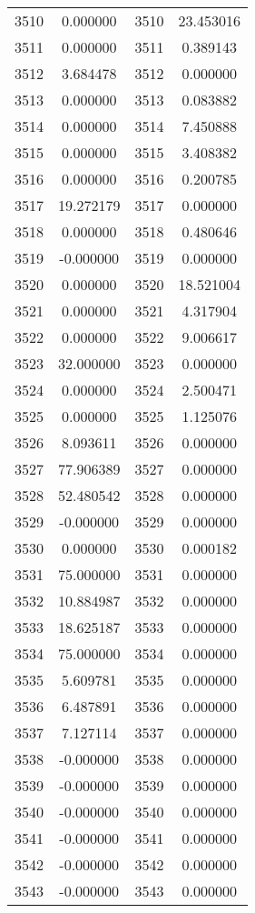 \documentclass[12pt]{article}
\begin{document}
\begin{longtable}{@{}cccc@{}}
3510 & 0.000000 & 3510 & 23.453016 \\
3511 & 0.000000 & 3511 & 0.389143 \\
3512 & 3.684478 & 3512 & 0.000000 \\
3513 & 0.000000 & 3513 & 0.083882 \\
3514 & 0.000000 & 3514 & 7.450888 \\
3515 & 0.000000 & 3515 & 3.408382 \\
3516 & 0.000000 & 3516 & 0.200785 \\
3517 & 19.272179 & 3517 & 0.000000 \\
3518 & 0.000000 & 3518 & 0.480646 \\
3519 & -0.000000 & 3519 & 0.000000 \\
3520 & 0.000000 & 3520 & 18.521004 \\
3521 & 0.000000 & 3521 & 4.317904 \\
3522 & 0.000000 & 3522 & 9.006617 \\
3523 & 32.000000 & 3523 & 0.000000 \\
3524 & 0.000000 & 3524 & 2.500471 \\
3525 & 0.000000 & 3525 & 1.125076 \\
3526 & 8.093611 & 3526 & 0.000000 \\
3527 & 77.906389 & 3527 & 0.000000 \\
3528 & 52.480542 & 3528 & 0.000000 \\
3529 & -0.000000 & 3529 & 0.000000 \\
3530 & 0.000000 & 3530 & 0.000182 \\
3531 & 75.000000 & 3531 & 0.000000 \\
3532 & 10.884987 & 3532 & 0.000000 \\
3533 & 18.625187 & 3533 & 0.000000 \\
3534 & 75.000000 & 3534 & 0.000000 \\
3535 & 5.609781 & 3535 & 0.000000 \\
3536 & 6.487891 & 3536 & 0.000000 \\
3537 & 7.127114 & 3537 & 0.000000 \\
3538 & -0.000000 & 3538 & 0.000000 \\
3539 & -0.000000 & 3539 & 0.000000 \\
3540 & -0.000000 & 3540 & 0.000000 \\
3541 & -0.000000 & 3541 & 0.000000 \\
3542 & -0.000000 & 3542 & 0.000000 \\
3543 & -0.000000 & 3543 & 0.000000 \\

\end{longtable}
\end{document}
